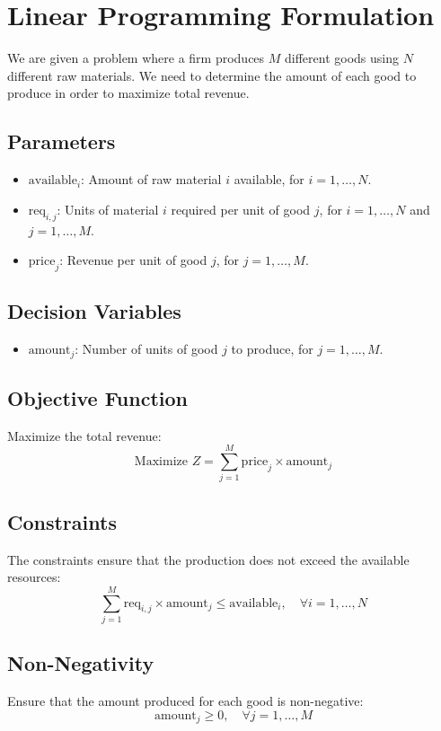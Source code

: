 \documentclass{article}
\begin{document}
\section*{Linear Programming Formulation}

We are given a problem where a firm produces \( M \) different goods using \( N \) different raw materials. We need to determine the amount of each good to produce in order to maximize total revenue.

\subsection*{Parameters}

\begin{itemize}
    \item \( \text{available}_i \): Amount of raw material \( i \) available, for \( i = 1, \ldots, N \).
    \item \( \text{req}_{i,j} \): Units of material \( i \) required per unit of good \( j \), for \( i = 1, \ldots, N \) and \( j = 1, \ldots, M \).
    \item \( \text{price}_j \): Revenue per unit of good \( j \), for \( j = 1, \ldots, M \).
\end{itemize}

\subsection*{Decision Variables}

\begin{itemize}
    \item \( \text{amount}_j \): Number of units of good \( j \) to produce, for \( j = 1, \ldots, M \).
\end{itemize}

\subsection*{Objective Function}

Maximize the total revenue:
\[
\text{Maximize } Z = \sum_{j=1}^{M} \text{price}_j \times \text{amount}_j
\]

\subsection*{Constraints}

The constraints ensure that the production does not exceed the available resources:
\[
\sum_{j=1}^{M} \text{req}_{i,j} \times \text{amount}_j \leq \text{available}_i, \quad \forall i = 1, \ldots, N
\]

\subsection*{Non-Negativity}

Ensure that the amount produced for each good is non-negative:
\[
\text{amount}_j \geq 0, \quad \forall j = 1, \ldots, M
\]
\end{document}
